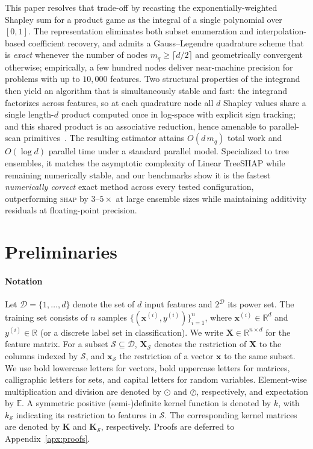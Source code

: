\documentclass{article}
\newcommand{\cD}{\mathcal{D}}
\newcommand{\cS}{\mathcal{S}}
\newcommand{\E}{\mathbb{E}}
\newcommand{\X}{\mathbf{X}}
\newcommand{\x}{\mathbf{x}}
\newcommand{\K}{\mathbf{K}}
\begin{document}
This paper resolves that trade-off by recasting the exponentially-weighted Shapley sum for a product game as the integral of a single polynomial over $[0,1]$. The representation eliminates both subset enumeration and interpolation-based coefficient recovery, and admits a Gauss--Legendre quadrature scheme that is \emph{exact} whenever the number of nodes $m_q \geq \lceil d/2 \rceil$ and geometrically convergent otherwise; empirically, a few hundred nodes deliver near-machine precision for problems with up to $10{,}000$ features. Two structural properties of the integrand then yield an algorithm that is simultaneously stable and fast: the integrand factorizes across features, so at each quadrature node all $d$ Shapley values share a single length-$d$ product computed once in log-space with explicit sign tracking; and this shared product is an associative reduction, hence amenable to parallel-scan primitives~\citep{blelloch1990prefix}. The resulting estimator attains $O(d\,m_q)$ total work and $O(\log d)$ parallel time under a standard parallel model. Specialized to tree ensembles, it matches the asymptotic complexity of Linear TreeSHAP while remaining numerically stable, and our benchmarks show it is the fastest \emph{numerically correct} exact method across every tested configuration, outperforming \textsc{shap} by $3$--$5{\times}$ at large ensemble sizes while maintaining additivity residuals at floating-point precision.


\section{Preliminaries}
\label{sec:preliminaries}

\paragraph{Notation}
Let $\cD = \{1,\dots,d\}$ denote the set of $d$ input features and $2^\cD$ its power set.
The training set consists of $n$ samples $\{(\x^{(i)}, y^{(i)})\}_{i=1}^n$, where
$\x^{(i)} \in \mathbb{R}^d$ and $y^{(i)} \in \mathbb{R}$ (or a discrete label set in classification).
We write $\X \in \mathbb{R}^{n \times d}$ for the feature matrix.
For a subset $\cS \subseteq \cD$, $\X_{\cS}$ denotes the restriction of $\X$ to the columns indexed by $\cS$,
and $\x_{\cS}$ the restriction of a vector $\x$ to the same subset.
We use bold lowercase letters for vectors, bold uppercase letters for matrices, calligraphic letters for sets, and capital letters for random variables.
Element-wise multiplication and division are denoted by $\odot$ and $\oslash$, respectively, and expectation by $\E$.
A symmetric positive (semi-)definite kernel function is denoted by $k$, with $k_{\cS}$ indicating its restriction to features in $\cS$.
The corresponding kernel matrices are denoted by $\K$ and $\K_{\cS}$, respectively. Proofs are deferred to Appendix~\ref{apx:proofs}.
\end{document}
